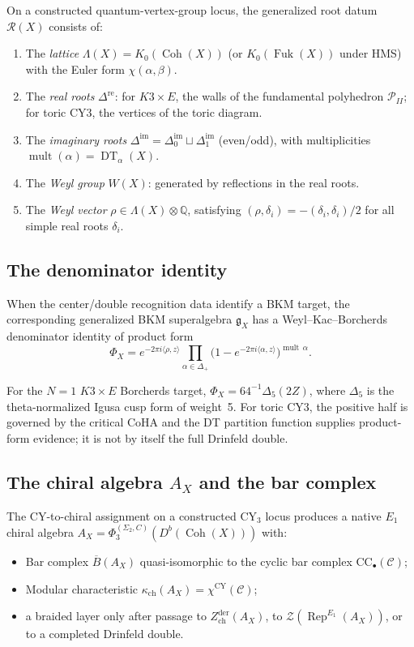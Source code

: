 \documentclass[11pt]{article}
\theoremstyle{definition}
\theoremstyle{remark}
\DeclareMathOperator{\Rep}{Rep}
\DeclareMathOperator{\Coh}{Coh}
\DeclareMathOperator{\Fuk}{Fuk}
\DeclareMathOperator{\mult}{mult}
\DeclareMathOperator{\DT}{DT}
\newcommand{\fkg}{\mathfrak{g}}
\newcommand{\cC}{\mathcal{C}}
\newcommand{\cR}{\mathcal{R}}
\newcommand{\cZ}{\mathcal{Z}}
\newcommand{\barB}{\overline{B}}
\begin{document}
On a constructed quantum-vertex-group locus, the generalized root datum
$\cR(X)$ consists of:
\begin{enumerate}[label=(\roman*)]
\item The \emph{lattice} $\Lambda(X) = K_0(\Coh(X))$ (or $K_0(\Fuk(X))$
under HMS) with the Euler form $\chi(\alpha, \beta)$.
\item The \emph{real roots} $\Delta^{\mathrm{re}}$: for $K3 \times E$,
the walls of the fundamental polyhedron $\mathcal{P}_{II}$; for toric
CY3, the vertices of the toric diagram.
\item The \emph{imaginary roots} $\Delta^{\mathrm{im}} =
\Delta^{\mathrm{im}}_0 \sqcup \Delta^{\mathrm{im}}_1$ (even/odd),
with multiplicities $\mult(\alpha) = \DT_\alpha(X)$.
\item The \emph{Weyl group} $W(X)$: generated by reflections in the
real roots.
\item The \emph{Weyl vector} $\rho \in \Lambda(X) \otimes \mathbb{Q}$,
satisfying $(\rho, \delta_i) = -(\delta_i, \delta_i)/2$ for all
simple real roots $\delta_i$.
\end{enumerate}

\subsection{The denominator identity}

When the center/double recognition data identify a BKM target, the
corresponding generalized BKM superalgebra $\fkg_X$ has a
Weyl--Kac--Borcherds denominator identity of product form
\begin{equation}\label{eq:denominator-product}
\Phi_X = e^{-2\pi i \langle \rho, z \rangle}
\prod_{\alpha \in \Delta_+}
\bigl(1 - e^{-2\pi i \langle \alpha, z \rangle}\bigr)^{\mult\,\alpha}.
\end{equation}

For the $N=1$ $K3 \times E$ Borcherds target,
$\Phi_X = 64^{-1}\Delta_5(2Z)$, where $\Delta_5$ is the
theta-normalized Igusa cusp form of weight~5. For toric CY3, the
positive half is governed by the critical CoHA and the DT partition
function supplies product-form evidence; it is not by itself the full
Drinfeld double.

\subsection{The chiral algebra $A_X$ and the bar complex}

The CY-to-chiral assignment on a constructed CY$_3$ locus produces a
native $E_1$ chiral algebra
$A_X = \Phi_3^{(\Sigma_2,C)}(D^b(\Coh(X)))$ with:
\begin{itemize}
\item Bar complex $\barB(A_X)$ quasi-isomorphic to the cyclic bar
complex $\mathrm{CC}_\bullet(\cC)$;
\item Modular characteristic $\kappa_{\mathrm{ch}}(A_X) = \chi^{\mathrm{CY}}(\cC)$;
\item a braided layer only after passage to
$Z^{\mathrm{der}}_{\mathrm{ch}}(A_X)$, to
$\cZ(\Rep^{E_1}(A_X))$, or to a completed Drinfeld double.
\end{itemize}
\end{document}
